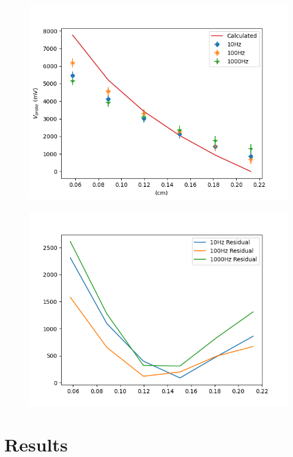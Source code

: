 \documentclass[10pt, twocolumn]{article}
\theoremstyle{definition}
\begin{document}
\newpage
\begin{figure}
  \centering
  \begin{minipage}{.5\textwidth}
    \centering
    \includegraphics[width=\linewidth]{Figure_1.png}
    \label{fig:coax-results}
  \end{minipage}%
  \begin{minipage}{.5\textwidth}
    \centering
    \includegraphics[width=\linewidth]{Figure_2.png}
    \label{fig:coax-residuals}
  \end{minipage}%
\end{figure}
\section{Results}
\end{document}
